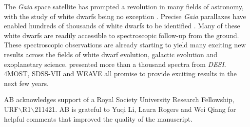 \documentclass[onecolumn,authoryear]{els-mrw}
\begin{document}
The {\it Gaia} space satellite has prompted a revolution in many fields of astronomy, with the study of white dwarfs being no exception \citep{Tremblay2024}. Precise {\it Gaia} parallaxes have enabled hundreds of thousands of white dwarfs to be identified \citep{Gentile-Fusillo2021}. Many of these white dwarfs are readily accessible to spectroscopic follow-up from the ground. These spectroscopic observations are already starting to yield many exciting new results across the fields of white dwarf evolution, galactic evolution and exoplanetary science.  \cite{Manser2024, Manser2024b} presented more than a thousand spectra from {\it DESI}. 4MOST, SDSS-VII and WEAVE all promise to provide exciting results in the next few years. 




\begin{ack}[Acknowledgments]
\indent AB acknowledges support
of a Royal Society University Research Fellowship, URF$\backslash $R1$\backslash $211421. AB is grateful to Yuqi Li, Laura Rogers and Wei Qiang for helpful comments that improved the quality of the manuscript. 

\end{ack}




\end{document}
